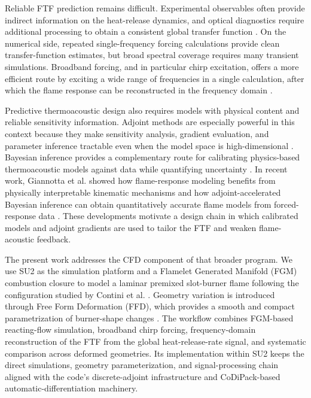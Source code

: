 \documentclass{iopconfser}
\begin{document}
Reliable FTF prediction remains difficult. Experimental observables often provide indirect information on the heat-release dynamics, and optical diagnostics require additional processing to obtain a consistent global transfer function \cite{han2015spatial,yuan2015reaction}. On the numerical side, repeated single-frequency forcing calculations provide clean transfer-function estimates, but broad spectral coverage requires many transient simulations. Broadband forcing, and in particular chirp excitation, offers a more efficient route by exciting a wide range of frequencies in a single calculation, after which the flame response can be reconstructed in the frequency domain \cite{schuller2002modelling}.

Predictive thermoacoustic design also requires models with physical content and reliable sensitivity information. Adjoint methods are especially powerful in this context because they make sensitivity analysis, gradient evaluation, and parameter inference tractable even when the model space is high-dimensional \cite{albring2016efficient,magri2013sensitivity,aguilar2017adjoint,aguilar2020thermoacoustic}. Bayesian inference provides a complementary route for calibrating physics-based thermoacoustic models against data while quantifying uncertainty \cite{juniper2022JSV,Yoko2023}. In recent work, Giannotta et al. showed how flame-response modeling benefits from physically interpretable kinematic mechanisms \cite{GiannottaCnF2023} and how adjoint-accelerated Bayesian inference can obtain quantitatively accurate flame models from forced-response data \cite{giannotta2025bayesian}. These developments motivate a design chain in which calibrated models and adjoint gradients are used to tailor the FTF and weaken flame-acoustic feedback.

The present work addresses the CFD component of that broader program. We use SU2 as the simulation platform and a Flamelet Generated Manifold (FGM) combustion closure to model a laminar premixed slot-burner flame following the configuration studied by Contini et al. \cite{palacios2013su2,vanOijen2000fgm,contini2020slotburner}. Geometry variation is introduced through Free Form Deformation (FFD), which provides a smooth and compact parametrization of burner-shape changes \cite{sederberg1986ffd}. The workflow combines FGM-based reacting-flow simulation, broadband chirp forcing, frequency-domain reconstruction of the FTF from the global heat-release-rate signal, and systematic comparison across deformed geometries. Its implementation within SU2 keeps the direct simulations, geometry parameterization, and signal-processing chain aligned with the code's discrete-adjoint infrastructure and CoDiPack-based automatic-differentiation machinery.
\end{document}
